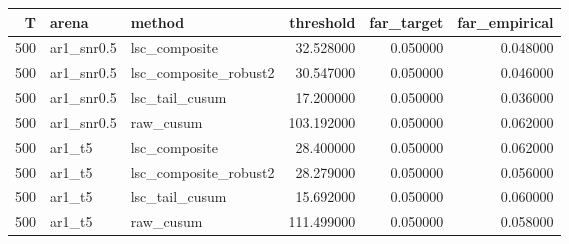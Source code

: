\begin{tabular}{rllrrr}
\toprule
T & arena & method & threshold & far_target & far_empirical \\
\midrule
500 & ar1_snr0.5 & lsc_composite & 32.528000 & 0.050000 & 0.048000 \\
500 & ar1_snr0.5 & lsc_composite_robust2 & 30.547000 & 0.050000 & 0.046000 \\
500 & ar1_snr0.5 & lsc_tail_cusum & 17.200000 & 0.050000 & 0.036000 \\
500 & ar1_snr0.5 & raw_cusum & 103.192000 & 0.050000 & 0.062000 \\
500 & ar1_t5 & lsc_composite & 28.400000 & 0.050000 & 0.062000 \\
500 & ar1_t5 & lsc_composite_robust2 & 28.279000 & 0.050000 & 0.056000 \\
500 & ar1_t5 & lsc_tail_cusum & 15.692000 & 0.050000 & 0.060000 \\
500 & ar1_t5 & raw_cusum & 111.499000 & 0.050000 & 0.058000 \\
\bottomrule
\end{tabular}
